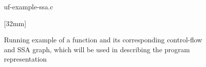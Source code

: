 \begin{figure}
  \centering

  \begin{minipage}{55mm}
    \centering%
                  {%
                                    {uf-example-ssa.c}%
                  }%
  \end{minipage}%
  \hfill%
  \begin{minipage}{67mm}
    \centering%
                  [32mm]%
                  {%
                  }

    \vspace{\baselineskip}

                  {}
  \end{minipage}

  \caption[Function example used in describing the program representation]%
          {%
            Running example of a function and its corresponding control-flow and
            SSA graph, which will be used in describing the program
            representation%
          }
\end{figure}%
%
